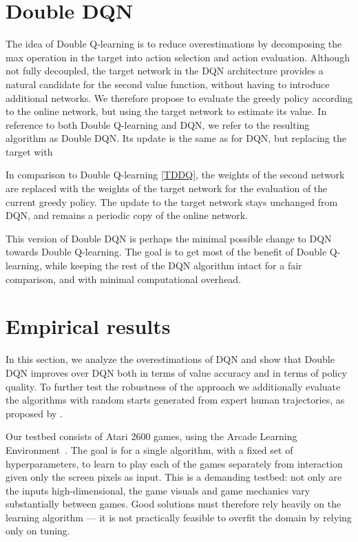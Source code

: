 \documentclass[letterpaper]{article}
\begin{document}
\section{Double DQN}

The idea of Double Q-learning is to reduce overestimations by decomposing the max operation 
in the target into action selection and action evaluation.
Although not fully decoupled, the target network in the DQN architecture provides a natural candidate for the second value function, without having to introduce additional networks. 
We therefore propose to evaluate the greedy policy according to the online network, but using the target network to estimate its value.
In reference to both Double Q-learning and DQN, we refer to the resulting algorithm as Double DQN. 
Its update is the same as for DQN, but replacing the target  with

In comparison to Double Q-learning \eqref{TDDQ}, the weights of the second network  are replaced with the weights of the target network  for the evaluation of the current greedy policy.  The update to the target network stays unchanged from DQN, and remains a periodic copy of the online network.

This version of Double DQN is perhaps the minimal possible change to DQN towards Double Q-learning.  The goal is to get most of the benefit of Double Q-learning, while keeping the rest of the DQN algorithm intact for a fair comparison, and with minimal computational overhead.

\section{Empirical results}
\label{sec:results}

In this section, we analyze the overestimations of DQN and show that Double DQN improves over DQN both in terms of value accuracy and in terms of policy quality. To further test the robustness of the approach we additionally evaluate  the algorithms with random starts generated from expert human trajectories, as proposed by \citet{Nair:2015}.

Our testbed consists of Atari 2600 games, using the Arcade Learning Environment~\citep{Bellemare:2013}. The goal is for a single algorithm, with a fixed set of hyperparameters, to learn to play each of the games separately from interaction given only the screen pixels as input. 
This is a demanding testbed: not only are the inputs high-dimensional, the game visuals and game mechanics vary substantially between games. Good solutions must therefore rely heavily on the learning algorithm --- it is not practically feasible to overfit the domain by relying only on tuning.  
\end{document}
